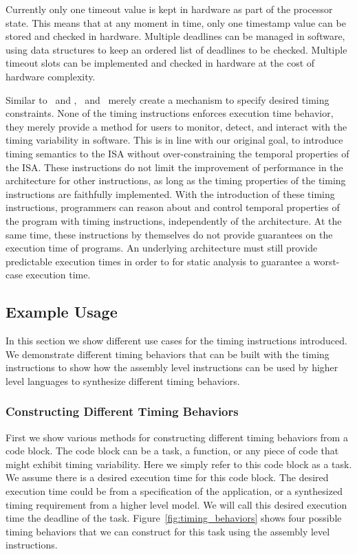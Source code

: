 Currently only one timeout value is kept in hardware as part of the processor state.
This means that at any moment in time, only one timestamp value can be stored and checked in hardware.
Multiple deadlines can be managed in software, using data structures to keep an ordered list of deadlines to be checked. 
Multiple timeout slots can be implemented and checked in hardware at the cost of hardware complexity.

\bigskip

Similar to \delayandset\ and \delayuntil, \exceptiononexpire\ and \deactivateexception\ merely create a mechanism to specify desired timing constraints. 
None of the timing instructions enforces execution time behavior, they merely provide a method for users to monitor, detect, and interact with the timing variability in software.     
This is in line with our original goal, to introduce timing semantics to the ISA without over-constraining the temporal properties of the ISA.
These instructions do not limit the improvement of performance in the architecture for other instructions, as long as the timing properties of the timing instructions are faithfully implemented.  
With the introduction of these timing instructions, programmers can reason about and control temporal properties of the program with timing instructions, independently of the architecture. 
At the same time, these instructions by themselves do not provide guarantees on the execution time of programs.
An underlying architecture must still provide predictable execution times in order to for static analysis to guarantee a worst-case execution time.     

\subsection{Example Usage}
\label{sec:timing_instruction_usage_notes}
In this section we show different use cases for the timing instructions introduced.  
We demonstrate different timing behaviors that can be built with the timing instructions to show how the assembly level instructions can be used by higher level languages to synthesize different timing behaviors.

\subsubsection{Constructing Different Timing Behaviors}
First we show various methods for constructing different timing behaviors from a code block.
The code block can be a task, a function, or any piece of code that might exhibit timing variability.
Here we simply refer to this code block as a task.    
We assume there is a desired execution time for this code block. 
The desired execution time could be from a specification of the application, or a synthesized timing requirement from a higher level model.
We will call this desired execution time the deadline of the task.
Figure~\ref{fig:timing_behaviors} shows four possible timing behaviors that we can construct for this task using the assembly level instructions.  

